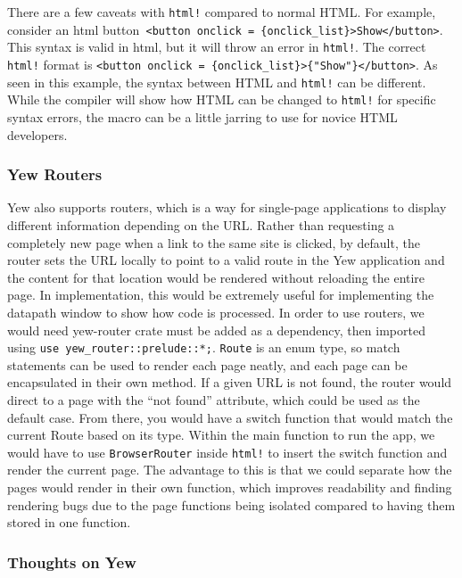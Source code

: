 \documentclass[
    paper=letter,
    parskip=half,
    fontsize=12pt,
    titlepage=firstiscover,
    toc=bibliography,
    numbers=endperiod
]{scrartcl}
\begin{document}
There are a few caveats with \texttt{html!} compared to normal HTML. For
example, consider an html button\texttt{ \textless button onclick =
    \{onclick\_list\}\textgreater Show\textless/button\textgreater}. This
syntax is valid in html, but it will throw an error in \texttt{html!}.
The correct \texttt{html!} format is \texttt{\textless button onclick =
    \{onclick\_list\}\textgreater\{"Show"\}\textless/button\textgreater}. As
seen in this example, the syntax between HTML and \texttt{html!} can be
different. While the compiler will show how HTML can be changed to
\texttt{html!} for specific syntax errors, the macro can be a little
jarring to use for novice HTML developers.

\subsubsection{Yew Routers}

Yew also supports routers, which is a way for single-page applications
to display different information depending on the URL. Rather than
requesting a completely new page when a link to the same site is
clicked, by default, the router sets the URL locally to point to a valid
route in the Yew application and the content for that location would be
rendered without reloading the entire page. In implementation, this
would be extremely useful for implementing the datapath window to show
how code is processed. In order to use routers, we would need yew-router
crate must be added as a dependency, then imported using \texttt{use
    yew\_router::prelude::*;}. \texttt{Route} is an enum type, so match
statements can be used to render each page neatly, and each page can be
encapsulated in their own method. If a given URL is not found, the
router would direct to a page with the ``not found'' attribute, which
could be used as the default case. From there, you would have a switch
function that would match the current Route based on its type. Within
the main function to run the app, we would have to use
\texttt{BrowserRouter} inside \texttt{html!} to insert the switch
function and render the current page. The advantage to this is that we
could separate how the pages would render in their own function, which
improves readability and finding rendering bugs due to the page
functions being isolated compared to having them stored in one function.

\subsubsection{Thoughts on Yew}
\end{document}
